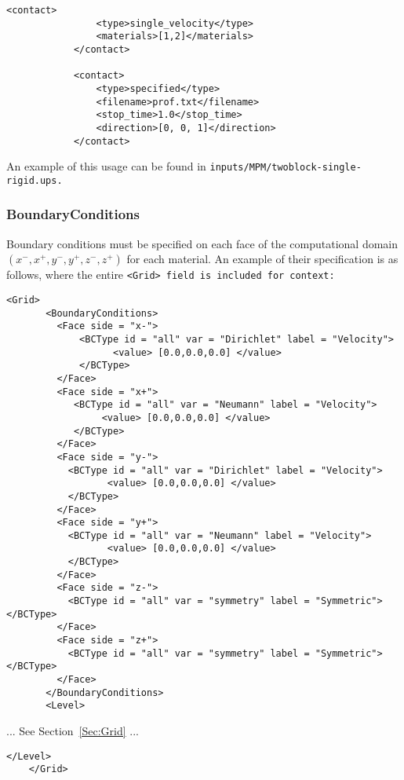 \begin{Verbatim}[fontsize=\footnotesize]
            <contact>
                <type>single_velocity</type>
                <materials>[1,2]</materials>
            </contact>

            <contact>
                <type>specified</type>
                <filename>prof.txt</filename>
                <stop_time>1.0</stop_time>
                <direction>[0, 0, 1]</direction>
            </contact>
\end{Verbatim}
An example of this usage can be found in \tt inputs/MPM/twoblock-single-rigid.ups. \normalfont

\subsubsection{BoundaryConditions} \label{Sec:MPM_BCs}

Boundary conditions must be specified on each face of the computational
domain $(x^-, x^+, y^-, y^+,z^-,z^+)$ for each material.  An example of their
specification is as follows, where the entire \tt <Grid> \normalfont field
is included for context:
\begin{Verbatim}[fontsize=\footnotesize]
    <Grid>
       <BoundaryConditions>
         <Face side = "x-">
             <BCType id = "all" var = "Dirichlet" label = "Velocity">
                   <value> [0.0,0.0,0.0] </value>
             </BCType>
         </Face>
         <Face side = "x+">
            <BCType id = "all" var = "Neumann" label = "Velocity">
                 <value> [0.0,0.0,0.0] </value>
            </BCType>
         </Face>
         <Face side = "y-">
           <BCType id = "all" var = "Dirichlet" label = "Velocity">
                  <value> [0.0,0.0,0.0] </value>
           </BCType>
         </Face>
         <Face side = "y+">
           <BCType id = "all" var = "Neumann" label = "Velocity">
                  <value> [0.0,0.0,0.0] </value>
           </BCType>
         </Face>
         <Face side = "z-">
           <BCType id = "all" var = "symmetry" label = "Symmetric"> </BCType>
         </Face>
         <Face side = "z+">
           <BCType id = "all" var = "symmetry" label = "Symmetric"> </BCType>
         </Face>
       </BoundaryConditions>
       <Level>
\end{Verbatim}

... See Section~\ref{Sec:Grid} ...

\begin{Verbatim}[fontsize=\footnotesize]
       </Level>
    </Grid>
\end{Verbatim}

